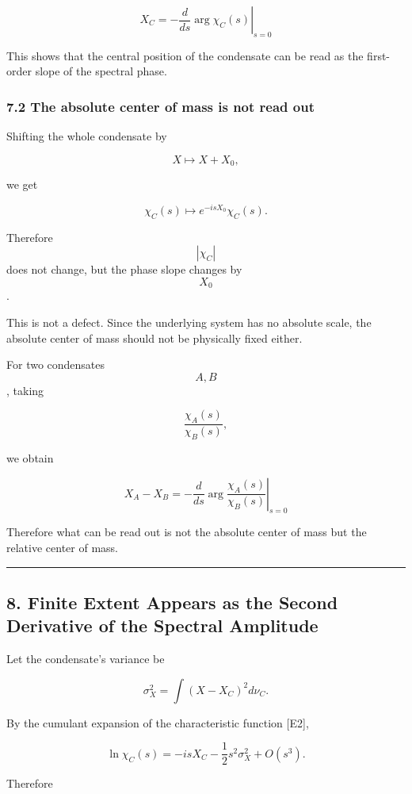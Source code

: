 \documentclass[
  a4paper,
]{article}
\begin{document}
\[
\boxed{
X_C
=
-
\left.
\frac{d}{ds}
\arg\chi_C(s)
\right|_{s=0}
}
\tag{19}
\]

This shows that the central position of the condensate can be read as
the first-order slope of the spectral phase.

\subsubsection{7.2 The absolute center of mass is not read
out}\label{the-absolute-center-of-mass-is-not-read-out}

Shifting the whole condensate by

\[
X\mapsto X+X_0,
\]

we get

\[
\chi_C(s)
\mapsto
 e^{-isX_0}\chi_C(s).
\tag{20}
\]

Therefore \[|\chi_C|\] does not change, but the phase slope changes by
\[X_0\].

This is not a defect. Since the underlying system has no absolute scale,
the absolute center of mass should not be physically fixed either.

For two condensates \[A,B\], taking

\[
\frac{\chi_A(s)}{\chi_B(s)},
\]

we obtain

\[
\boxed{
X_A-X_B
=
-
\left.
\frac{d}{ds}
\arg
\frac{\chi_A(s)}{\chi_B(s)}
\right|_{s=0}
}
\tag{21}
\]

Therefore what can be read out is not the absolute center of mass but
the relative center of mass.

\begin{center}\rule{0.5\linewidth}{0.5pt}\end{center}

\subsection{8. Finite Extent Appears as the Second Derivative of the
Spectral
Amplitude}\label{finite-extent-appears-as-the-second-derivative-of-the-spectral-amplitude}

Let the condensate's variance be

\[
\sigma_X^2
=
\int
(X-X_C)^2
d\nu_C.
\tag{22}
\]

By the cumulant expansion of the characteristic function {[}E2{]},

\[
\ln\chi_C(s)
=
-isX_C
-
\frac12
s^2\sigma_X^2
+
O(s^3).
\tag{23}
\]

Therefore
\end{document}
